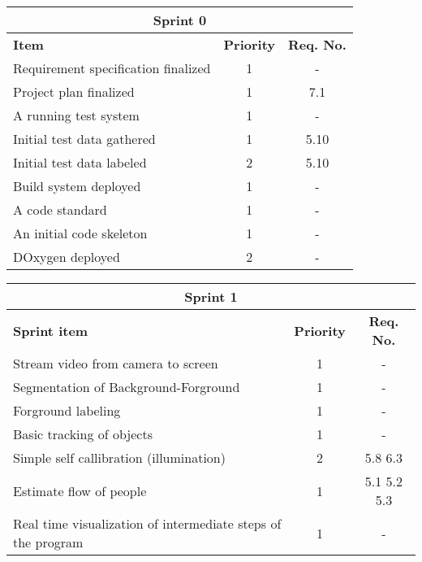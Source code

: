 \label{sprint0}
\begin{center}
	\begin{Large}
	\begin{tabular}{|p{10.5cm}|c|c|}
		\hline
		\multicolumn{3}{|c|}{\textbf{Sprint 0}} \\
		\hline
		\large{\textbf{Item}} & \large{\textbf{Priority}} & \large{\textbf{Req. No.}} \\
		\hline
		\large{Requirement specification finalized} & \large{1} & - \\
		\hline
		\large{Project plan finalized} & \large{1} & 7.1 \\
		\hline
		\large{A running test system} & \large{1} & - \\
		\hline
		\large{Initial test data gathered} & \large{1} & 5.10 \\
		\hline
		\large{Initial test data labeled} & \large{2} & 5.10 \\
		\hline
		\large{Build system deployed} & \large{1} & - \\
		\hline	
		\large{A code standard} & \large{1} & - \\
		\hline	
		\large{An initial code skeleton} & \large{1} & - \\
		\hline	
		\large{DOxygen deployed} & \large{2} & - \\
		\hline		
	\end{tabular}
	\end{Large}
\end{center}



\label{sprint1}
\begin{center}
	\begin{Large}
	\begin{tabular}{|p{10.5cm}|c|c|}
		\hline
		\multicolumn{3}{|c|}{\textbf{Sprint 1}} \\
		\hline
		\large{\textbf{Sprint item}} & \large{\textbf{Priority}} & \large{\textbf{Req. No.}} \\
		\hline
		\large{Stream video from camera to screen} & \large{1} & - \\
		\hline
		\large{Segmentation of Background-Forground} & \large{1} & - \\
		\hline
		\large{Forground labeling} & \large{1} & - \\
		\hline
		\large{Basic tracking of objects} & \large{1} & - \\
		\hline
		\large{Simple self callibration (illumination)} & \large{2} & 5.8 6.3 \\
		\hline
		\large{Estimate flow of people} & \large{1} & 5.1 5.2 5.3 \\
		\hline
		\large{Real time visualization of intermediate steps of the program} & \large{1} & - \\
		\hline
	\end{tabular}
	\end{Large}
\end{center}



